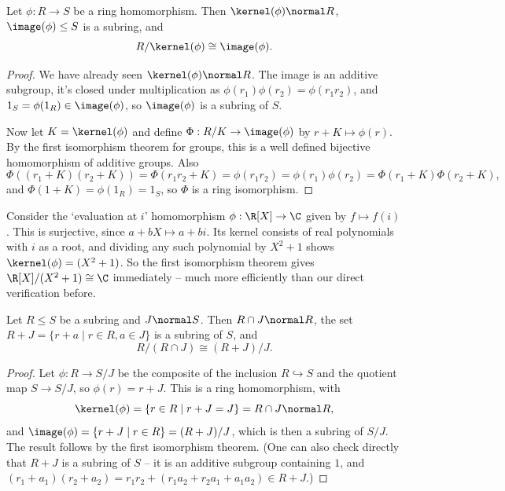 \begin{theorem}
	Let $\phi: R \rightarrow S$ be a ring homomorphism. Then $\kernel (\phi) \normal R$, $\image(\phi) \leq S$ is a subring, and
	$$
	R/\kernel(\phi) \cong \image(\phi).
	$$
\end{theorem}
\begin{proof}
	We have already seen $\kernel(\phi) \normal R$. The image is an additive subgroup, it's closed under multiplication as $\phi(r_1)\phi(r_2) = \phi(r_1 r_2)$, and $1_S = \phi(1_R) \in \image(\phi)$, so $\image(\phi)$ is a subring of $S$.

	Now let $K = \kernel(\phi)$ and define $\Phi: R/K \rightarrow \image(\phi)$ by $r + K \mapsto \phi(r)$. By the first isomorphism theorem for groups, this is a well defined bijective homomorphism of additive groups. Also
	$$
	\Phi((r_1 + K)(r_2 + K)) = \Phi(r_1 r_2 + K) = \phi(r_1 r_2) = \phi(r_1)\phi(r_2) = \Phi(r_1 + K) \Phi(r_2 + K),
	$$
	and $\Phi(1 + K) = \phi(1_R) = 1_S$, so $\Phi$ is a ring isomorphism.
\end{proof}

\begin{example}
	Consider the `evaluation at $i$' homomorphism $\phi: \R[X] \rightarrow \C$ given by $f \mapsto f(i)$. This is surjective, since $a + bX \mapsto a + bi$. Its kernel consists of real polynomials with $i$ as a root, and dividing any such polynomial by $X^2 + 1$ shows $\kernel(\phi) = (X^2 + 1)$. So the first isomorphism theorem gives $\R[X]/(X^2 + 1) \cong \C$ immediately -- much more efficiently than our direct verification before.
\end{example}

\begin{theorem}
	Let $R \leq S$ be a subring and $J \normal S$. Then $R \cap J \normal R$, the set $R + J = \{r + a \mid r \in R, a \in J\}$ is a subring of $S$, and
	$$
	R/(R \cap J) \cong (R + J)/J.
	$$
\end{theorem}
\begin{proof}
	Let $\phi: R \rightarrow S/J$ be the composite of the inclusion $R \hookrightarrow S$ and the quotient map $S \rightarrow S/J$, so $\phi(r) = r + J$. This is a ring homomorphism, with
	$$
	\kernel(\phi) = \{r \in R \mid r + J = J\} = R \cap J \normal R,
	$$
	and $\image(\phi) = \{r + J \mid r \in R\} = (R + J)/J$, which is then a subring of $S/J$. The result follows by the first isomorphism theorem. (One can also check directly that $R + J$ is a subring of $S$ -- it is an additive subgroup containing $1$, and $(r_1 + a_1)(r_2 + a_2) = r_1 r_2 + (r_1 a_2 + r_2 a_1 + a_1 a_2) \in R + J$.)
\end{proof}

